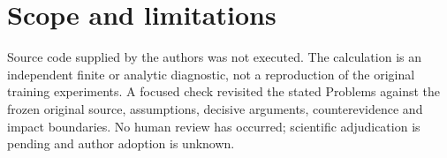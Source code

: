\documentclass[10pt]{article}
\begin{document}
\section*{Scope and limitations}
Source code supplied by the authors was not executed. The calculation is an independent finite or analytic diagnostic, not a reproduction of the original training experiments. A focused check revisited the stated Problems against the frozen original source, assumptions, decisive arguments, counterevidence and impact boundaries. No human review has occurred; scientific adjudication is pending and author adoption is unknown.\par
\end{document}
